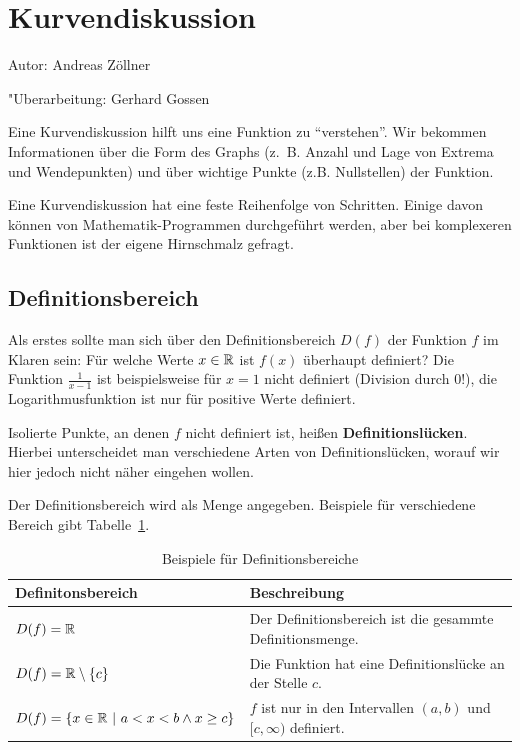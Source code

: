 

\section{Kurvendiskussion}
\label{sec:kurvendiskussion}

Autor: Andreas Zöllner

\noindent "Uberarbeitung: Gerhard Gossen

\mbox{}\par

\noindent Eine Kurvendiskussion hilft uns eine Funktion zu "`verstehen"'. Wir bekommen Informationen über die Form des Graphs (z.~B. Anzahl und Lage von Extrema und Wendepunkten) und über wichtige Punkte (z.B. Nullstellen) der Funktion.

\noindent Eine Kurvendiskussion hat eine feste Reihenfolge von Schritten. Einige davon können von Mathematik-Programmen durchgeführt werden, aber bei komplexeren Funktionen ist der eigene Hirnschmalz gefragt.

\subsection{Definitionsbereich}

Als erstes sollte man sich über den Definitionsbereich $D(f)$ der Funktion $f$
im Klaren sein: Für welche Werte $x\in\mathbb{R}$ ist $f(x)$ überhaupt definiert? Die Funktion $\frac{1}{x-1}$ ist beispielsweise für $x=1$ nicht definiert (Division durch 0!), die Logarithmusfunktion ist nur für positive Werte definiert. 

\noindent Isolierte Punkte, an denen $f$ nicht definiert ist, heißen
\textbf{Definitionslücken}. Hierbei unterscheidet man verschiedene Arten von
Definitionslücken, worauf wir hier jedoch nicht näher eingehen wollen.

\noindent Der Definitionsbereich wird als Menge angegeben. Beispiele für verschiedene Bereich gibt Tabelle~\ref{tab:definitionsbereiche}.

\begin{table}[b]
\begin{tabular}{l|p{13em}}
\textbf{Definitonsbereich} & \textbf{Beschreibung}\\
\hline
$D(f) = \mathbb{R}$ & Der Definitionsbereich ist die gesammte Definitionsmenge.\\

$D(f) = \mathbb{R} \setminus \{c\}$ & Die Funktion hat eine Definitionslücke an der Stelle $c$.\\
$D(f) = \{x\in\mathbb{R}\ |\ a < x < b \wedge x\geq c\}$ & $f$ ist nur in den Intervallen $(a,b)$ und $[c,\infty)$ definiert.
\end{tabular}
\vspace{-1em}
\caption{Beispiele für Definitionsbereiche}
\label{tab:definitionsbereiche}
\end{table}



